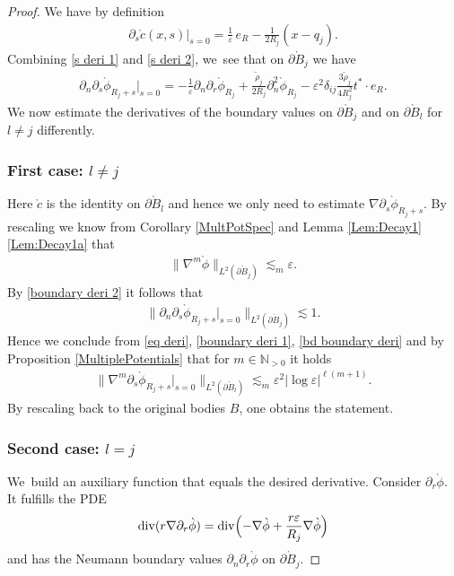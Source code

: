 \documentclass[JEP,XML,SOM,Unicode,published]{cedram}
\let\epsilon\varepsilon
\theoremstyle{definition}
\renewcommand{\div}{\operatorname{div}}
\newcommand\N{\mathbb{N}}
\newcommand\bnorm[1]{\bigl\lVert #1\bigr\rVert}
\newcommand\eq{=}
\let\de\partial
\let\eps\epsilon
\begin{document}
\begin{proof}
We have by definition
\begin{align*}
\de_s\grave{c}(x,s)\big|_{s=0}\eq\frac{1}{\eps}\,e_R-\frac{1}{2R_j}(x-q_j).
\end{align*}
Combining \eqref{s deri 1} and \eqref{s deri 2}, we~see that on $\de\grave{B}_j$ we have
\begin{align}
\de_n\de_{s}\grave{\phi}_{R_j+s}\big|_{s=0}\eq - \frac{1}{\eps}\de_n\de_r\grave{\phi}_{R_j}+\frac{\tilde{\rho}_j}{2R_j}\de_n^2\grave{\phi}_{R_j}-\eps^2\delta_{ij}\frac{3\tilde{\rho}_j}{4R_j^2}t^*\cdot e_R.\label{boundary deri 2}
\end{align}
We now estimate the derivatives of the boundary values on $\de\grave{B}_j$ and on $\de\grave{B}_l$ for $l\neq j$ differently.

\subsubsection*{First case: $l\neq j$}
Here $\grave{c}$ is the identity on $\de\grave{B}_l$ and hence we only need to estimate $\nabla\de_s\grave{\phi}_{R_j+s}$.
By rescaling we know from Corollary \ref{MultPotSpec} and Lemma \ref{Lem:Decay1}\,\eqref{Lem:Decay1a} that
\begin{align*}
\bnorm{\nabla^m\grave{\phi}}_{L^2(\de\grave{B}_j)}\lesssim_m \eps.
\end{align*}
By \eqref{boundary deri 2} it follows that
\begin{align}
\bnorm{\de_n\de_{s}\grave{\phi}_{R_j+s}\big|_{s=0}}_{L^2(\de\grave{B}_j)}\lesssim 1.\label{bd boundary deri}
\end{align}
Hence we conclude from \eqref{eq deri}, \eqref{boundary deri 1}, \eqref{bd boundary deri} and by Proposition \ref{MultiplePotentials} that for $m\in \N_{>0}$ it holds
\begin{align*}
\bnorm{\nabla^m\de_s\grave{\phi}_{R_j+s}\big|_{s=0}}_{L^2(\de\grave{B}_l)}\lesssim_m \eps^{2}|{\log\eps}|^{\ell(m+1)}.
\end{align*}
By rescaling back to the original bodies $B$, one obtains the statement.

\subsubsection*{Second case: $l=j$}
We~build an auxiliary function that equals the desired derivative.
Consider $\de_r\grave{\phi}$. It fulfills the PDE
\begin{align}
\div(r\nabla\de_r\grave{\phi})\eq\div\Bigl(-\nabla\grave{\phi}+\frac{r\eps}{R_j}\nabla\grave{\phi}\Bigr) \label{r eq}
\end{align}
and has the Neumann boundary values $\de_n\de_r\grave{\phi}$ on $\de\grave{B}_j$.


\end{proof}
\end{document}
